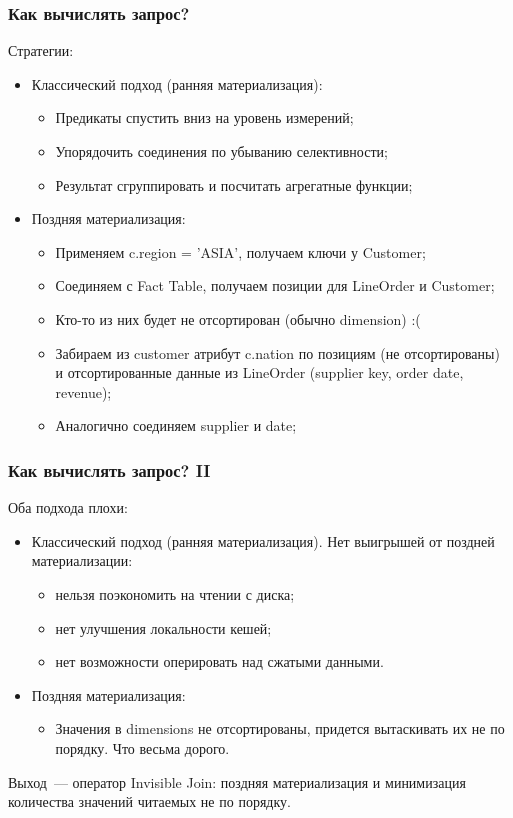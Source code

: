 \documentclass{beamer}
\begin{document}
\begin{frame}
\frametitle{Как вычислять запрос?}

Стратегии:

\begin{itemize}
  \setlength\itemsep{1em}
  \item Классический подход (ранняя материализация):
  \begin{itemize}
    \item Предикаты спустить вниз на уровень измерений;
    \item Упорядочить соединения по убыванию селективности;
    \item Результат сгруппировать и посчитать агрегатные функции;
  \end{itemize}
  \item Поздняя материализация:
  \begin{itemize}
    \item Применяем c.region = 'ASIA', получаем ключи у Customer;
    \item Соединяем с Fact Table, получаем позиции для LineOrder и Customer;
    \item Кто-то из них будет не отсортирован (обычно dimension) :(
    \item Забираем из customer атрибут c.nation по позициям (не отсортированы) и отсортированные данные из LineOrder (supplier key, order date, revenue);
    \item Аналогично соединяем supplier и date;
  \end{itemize}
\end{itemize}

\end{frame}

\begin{frame}
\frametitle{Как вычислять запрос? II}

Оба подхода плохи:

\begin{itemize}
	\setlength\itemsep{1em}
	\item Классический подход (ранняя материализация). Нет выигрышей от поздней материализации:
	\begin{itemize}
		\item нельзя поэкономить на чтении с диска;
		\item нет улучшения локальности кешей;
		\item нет возможности оперировать над сжатыми данными.
	\end{itemize}
	\item Поздняя материализация:
	\begin{itemize}
		\item Значения в dimensions не отсортированы, придется вытаскивать их не по порядку. Что весьма дорого.
	\end{itemize}
\end{itemize}

Выход~--- оператор Invisible Join: поздняя материализация и минимизация количества значений читаемых не по порядку.

\end{frame}
\end{document}
